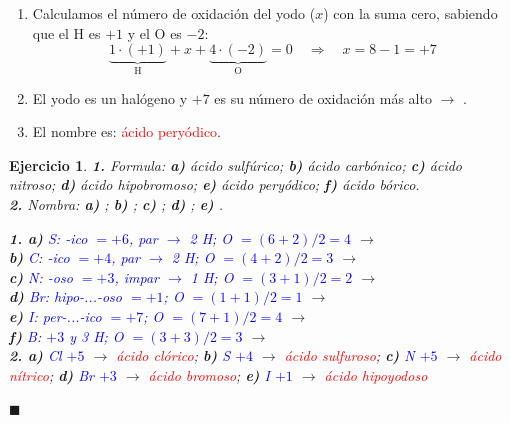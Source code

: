 \documentclass[12pt]{article}
\theoremstyle{mygreennumbox}
\newtheorem{ejercicioT}{Ejercicio}[section]
\newenvironment{exercise}{\begin{eBoxmygreen}\begin{ejercicioT}}{\hfill{\color{mygreen}\tiny\ensuremath{\blacksquare}}\end{ejercicioT}\end{eBoxmygreen}}
\begin{document}
\begin{ejemplo}
    \begin{enumerate}[label=\numberballgreen]
        \item Calculamos el número de oxidación del yodo (\(x\)) con la suma cero, sabiendo que el H es \(+1\) y el O es \(-2\):
              \begin{equation*}
                  \underbrace{1\cdot(+1)}_{\text{H}} + x + \underbrace{4\cdot(-2)}_{\text{O}} = 0 \quad\Rightarrow\quad x = 8 - 1 = +7
              \end{equation*}
        \item El yodo es un halógeno y \(+7\) es su número de oxidación más alto \(\to\) .
        \item El nombre es: \textcolor{red}{ácido peryódico}.
    \end{enumerate}
\end{ejemplo}

\begin{exercise}
    \textbf{1.} Formula: \textbf{a)} ácido sulfúrico; \textbf{b)} ácido carbónico; \textbf{c)} ácido nitroso; \textbf{d)} ácido hipobromoso; \textbf{e)} ácido peryódico; \textbf{f)} ácido bórico.\\
    \textbf{2.} Nombra: \textbf{a)} ; \textbf{b)} ; \textbf{c)} ; \textbf{d)} ; \textbf{e)} .
    \begin{solu}
        \textbf{1. a)} \textcolor{blue}{S: -ico \(=+6\), par \(\to\) 2 H; O \(=(6+2)/2=4\)} \(\to\) \textcolor{red}{}\\
        \textbf{b)} \textcolor{blue}{C: -ico \(=+4\), par \(\to\) 2 H; O \(=(4+2)/2=3\)} \(\to\) \textcolor{red}{}\\
        \textbf{c)} \textcolor{blue}{N: -oso \(=+3\), impar \(\to\) 1 H; O \(=(3+1)/2=2\)} \(\to\) \textcolor{red}{}\\
        \textbf{d)} \textcolor{blue}{Br: hipo-...-oso \(=+1\); O \(=(1+1)/2=1\)} \(\to\) \textcolor{red}{}\\
        \textbf{e)} \textcolor{blue}{I: per-...-ico \(=+7\); O \(=(7+1)/2=4\)} \(\to\) \textcolor{red}{}\\
        \textbf{f)} \textcolor{blue}{B: \(+3\) y 3 H; O \(=(3+3)/2=3\)} \(\to\) \textcolor{red}{}\\
        \textbf{2. a)} \textcolor{blue}{Cl \(+5\)} \(\to\) \textcolor{red}{ácido clórico}; \textbf{b)} \textcolor{blue}{S \(+4\)} \(\to\) \textcolor{red}{ácido sulfuroso}; \textbf{c)} \textcolor{blue}{N \(+5\)} \(\to\) \textcolor{red}{ácido nítrico}; \textbf{d)} \textcolor{blue}{Br \(+3\)} \(\to\) \textcolor{red}{ácido bromoso}; \textbf{e)} \textcolor{blue}{I \(+1\)} \(\to\) \textcolor{red}{ácido hipoyodoso}
    \end{solu}
\end{exercise}
\end{document}
